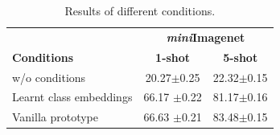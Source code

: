 \begin{table}[ht]
\caption{Results of different conditions.}
\centering
\begin{tabular}{lcc}
\toprule 
 &  \multicolumn{2}{c}{\textbf{\textit{mini}Imagenet}}  \\
\textbf{Conditions} & \textbf{1-shot} & \textbf{5-shot}   \\
\midrule 
w/o conditions  & 20.27\textcolor{mygray}{\scriptsize{$\pm$0.25}} & 22.32\textcolor{mygray}{\scriptsize{$\pm$0.15}} \\
Learnt class embeddings & 66.17 \textcolor{mygray}{\scriptsize{$\pm$0.22}} & 81.17\textcolor{mygray}{\scriptsize{$\pm$0.16}}  \\
Vanilla prototype & 66.63 \textcolor{mygray}{\scriptsize{$\pm$0.21}} & 83.48\textcolor{mygray}{\scriptsize{$\pm$0.15}}  \\
\bottomrule
\end{tabular}
\label{tab:conditions}
\end{table}

